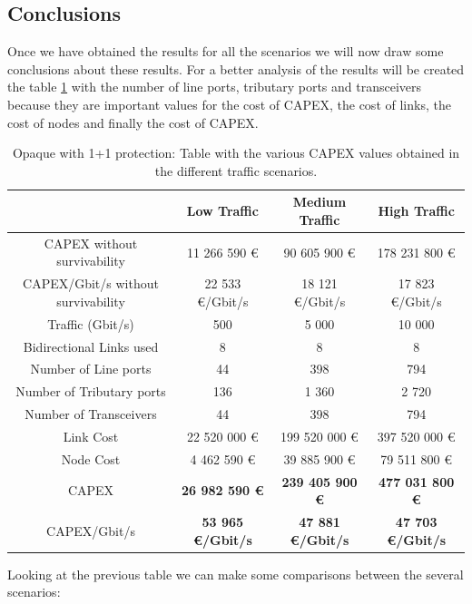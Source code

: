 \subsection{Conclusions}

Once we have obtained the results for all the scenarios we will now draw some conclusions about these results. For a better analysis of the results will be created the table \ref{table_comparative_opaque_protec} with the number of line ports, tributary ports and transceivers because they are important values for the cost of CAPEX, the cost of links, the cost of nodes and finally the cost of CAPEX.\\

\begin{table}[h!]
\centering
\begin{tabular}{| c | c | c | c |}
 \hline
  & Low Traffic & Medium Traffic  & High Traffic \\
 \hline\hline
 CAPEX without survivability&11 266 590 \euro&90 605 900 \euro&178 231 800 \euro\\ \hline
 CAPEX/Gbit/s without survivability&22 533 \euro/Gbit/s&18 121 \euro/Gbit/s&17 823 \euro/Gbit/s\\ \hline
 Traffic (Gbit/s) & 500 & 5 000 & 10 000 \\ \hline
 Bidirectional Links used & 8 & 8 & 8 \\ \hline
 Number of Line ports & 44 & 398 & 794 \\ \hline
 Number of Tributary ports & 136 & 1 360 & 2 720 \\ \hline
 Number of Transceivers & 44 & 398 & 794 \\ \hline
 Link Cost & 22 520 000 \euro & 199 520 000 \euro & 397 520 000 \euro \\ \hline
 Node Cost & 4 462 590 \euro & 39 885 900 \euro & 79 511 800 \euro \\ \hline
 CAPEX & \textbf{26 982 590 \euro} & \textbf{239 405 900 \euro} & \textbf{477 031 800 \euro} \\ \hline
 CAPEX/Gbit/s & \textbf{53 965 \euro/Gbit/s} & \textbf{47 881 \euro/Gbit/s} & \textbf{47 703 \euro/Gbit/s}\\
 \hline
\end{tabular}
\caption{Opaque with 1+1 protection: Table with the various CAPEX values obtained in the different traffic scenarios.}
\label{table_comparative_opaque_protec}
\end{table}

\newpage
Looking at the previous table we can make some comparisons between the several scenarios:

